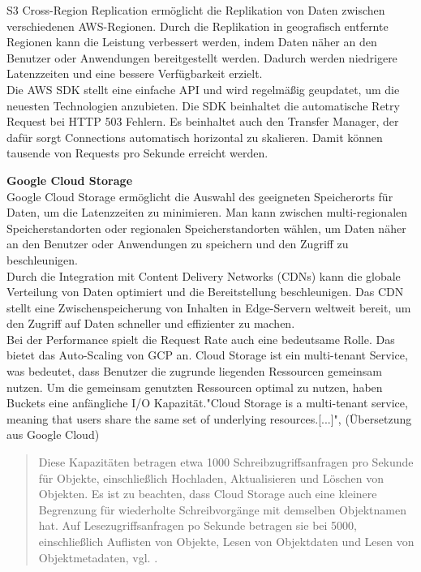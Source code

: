 S3 Cross-Region Replication ermöglicht die Replikation von Daten zwischen verschiedenen AWS-Regionen. Durch die Replikation in geografisch entfernte Regionen kann die Leistung verbessert werden, indem Daten näher an den Benutzer oder Anwendungen bereitgestellt werden. Dadurch werden niedrigere Latenzzeiten und eine bessere Verfügbarkeit erzielt.\\

Die AWS SDK stellt eine einfache API und wird regelmäßig geupdatet, um die neuesten Technologien anzubieten. Die SDK beinhaltet die automatische Retry Request bei HTTP 503 Fehlern. Es beinhaltet auch den Transfer Manager, der dafür sorgt Connections automatisch horizontal zu skalieren. Damit können tausende von Requests pro Sekunde erreicht werden.

\newpage

\textbf{Google Cloud Storage}\\

Google Cloud Storage ermöglicht die Auswahl des geeigneten Speicherorts für Daten, um die Latenzzeiten zu minimieren. Man kann zwischen multi-regionalen Speicherstandorten oder regionalen Speicherstandorten wählen, um Daten näher an den Benutzer oder Anwendungen zu speichern und den Zugriff zu beschleunigen.\\ 

Durch die Integration mit Content Delivery Networks (CDNs) kann die globale Verteilung von Daten optimiert und die Bereitstellung beschleunigen. Das CDN stellt eine Zwischenspeicherung von Inhalten in Edge-Servern weltweit bereit, um den Zugriff auf Daten schneller und effizienter zu machen.\\

Bei der Performance spielt die Request Rate auch eine bedeutsame Rolle. Das bietet das Auto-Scaling von GCP an. Cloud Storage ist ein multi-tenant Service, was bedeutet, dass Benutzer die zugrunde liegenden Ressourcen gemeinsam nutzen. Um die gemeinsam genutzten Ressourcen optimal zu nutzen, haben Buckets eine anfängliche I/O Kapazität."Cloud Storage is a multi-tenant service, meaning that users share the same set of underlying resources.[...]", \cite{gcp-autoscale} (Übersetzung aus Google Cloud)

 \begin{quote}
 	Diese Kapazitäten betragen etwa 1000 Schreibzugriffsanfragen pro Sekunde für Objekte, einschließlich Hochladen, Aktualisieren und Löschen von Objekten. Es ist zu beachten, dass Cloud Storage auch eine kleinere Begrenzung für wiederholte Schreibvorgänge mit demselben Objektnamen hat. Auf Lesezugriffsanfragen po Sekunde betragen sie bei 5000, einschließlich Auflisten von Objekte, Lesen von Objektdaten und Lesen von Objektmetadaten, vgl. \cite{gcp-autoscale}.
 \end{quote}
 
